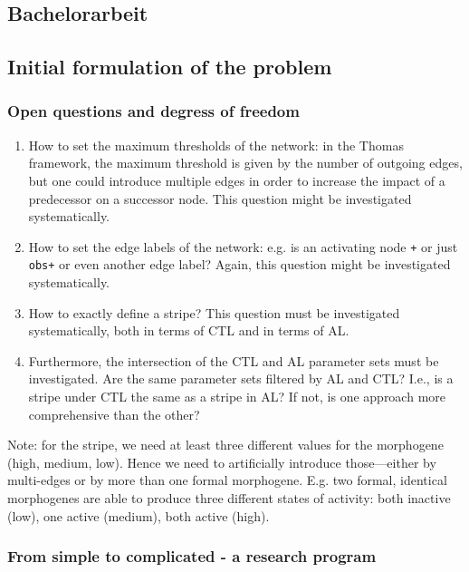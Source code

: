\documentclass{article}
\begin{document}
\begin{flushleft}

\section{Bachelorarbeit}

\subsection{Initial formulation of the problem}

\subsubsection{Open questions and degress of freedom}

\begin{enumerate}
  \item How to set the maximum thresholds of the network: in the Thomas
  framework, the maximum threshold is given by the number of outgoing edges, but
  one could introduce multiple edges in order to increase the impact of a
  predecessor on a successor node. This question might be investigated
  systematically.
  \item How to set the edge labels of the network: e.g. is an activating node
  {\tt +} or just {\tt obs+} or even another edge label? Again, this question
  might be investigated systematically.
  \item How to exactly define a stripe? This question must be investigated
  systematically, both in terms of CTL and in terms of AL.
  \item Furthermore, the intersection of the CTL and AL parameter sets must be
  investigated. Are the same parameter sets filtered by AL and CTL? I.e., is a
  stripe under CTL the same as a stripe in AL? If not, is one approach more
  comprehensive than the other?
\end{enumerate}

Note: for the stripe, we need at least three different values for the morphogene
(high, medium, low). Hence we need to artificially introduce those---either by
multi-edges or by more than one formal morphogene. E.g. two formal, identical
morphogenes are able to produce three different states of activity: both
inactive (low), one active (medium), both active (high).

\subsubsection{From simple to complicated - a research program}


\end{flushleft}
\end{document}
